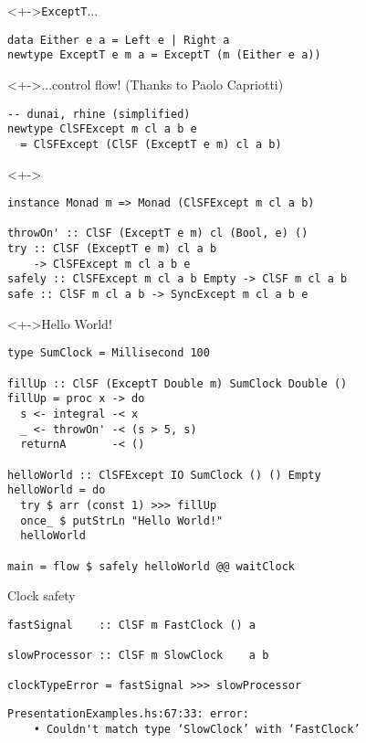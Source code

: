 \documentclass{enigtex-beamer-base}
\begin{document}
\begin{frame}[fragile]
\begin{block}<+->{\texttt{ExceptT}...}
\begin{verbatim}
data Either e a = Left e | Right a
newtype ExceptT e m a = ExceptT (m (Either e a))
\end{verbatim}
\end{block}

\begin{block}<+->{...control flow! (Thanks to Paolo Capriotti)}
\begin{verbatim}
-- dunai, rhine (simplified)
newtype ClSFExcept m cl a b e
  = ClSFExcept (ClSF (ExceptT e m) cl a b)
\end{verbatim}
\end{block}

\begin{block}<+->{}
\begin{verbatim}
instance Monad m => Monad (ClSFExcept m cl a b)

throwOn' :: ClSF (ExceptT e m) cl (Bool, e) ()
try :: ClSF (ExceptT e m) cl a b
    -> ClSFExcept m cl a b e
safely :: ClSFExcept m cl a b Empty -> ClSF m cl a b
safe :: ClSF m cl a b -> SyncExcept m cl a b e
\end{verbatim}
\end{block}
\end{frame}

\begin{frame}[fragile]
\begin{block}<+->{Hello World!}
\begin{verbatim}
type SumClock = Millisecond 100

fillUp :: ClSF (ExceptT Double m) SumClock Double ()
fillUp = proc x -> do
  s <- integral -< x
  _ <- throwOn' -< (s > 5, s)
  returnA       -< ()

helloWorld :: ClSFExcept IO SumClock () () Empty
helloWorld = do
  try $ arr (const 1) >>> fillUp
  once_ $ putStrLn "Hello World!"
  helloWorld

main = flow $ safely helloWorld @@ waitClock
\end{verbatim}
\end{block}
\end{frame}

\begin{frame}[fragile]
\begin{block}{Clock safety}
\begin{verbatim}
fastSignal    :: ClSF m FastClock () a

slowProcessor :: ClSF m SlowClock    a b

clockTypeError = fastSignal >>> slowProcessor
\end{verbatim}
\end{block}
\begin{verbatim}
PresentationExamples.hs:67:33: error:
    • Couldn't match type ‘SlowClock’ with ‘FastClock’
\end{verbatim}
\end{frame}
\end{document}
